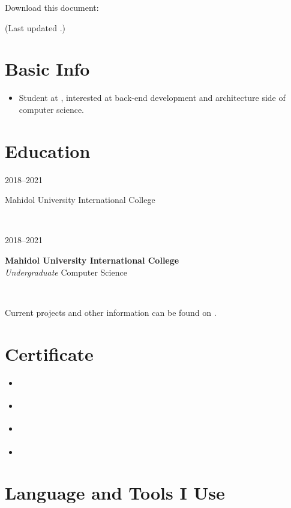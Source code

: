 \documentclass[letterpaper,
		10pt]{article}
\author{Vikrom Narula}
\date{\today}
\let\oldhref\href
\renewcommand{\href}[3][blue]{\oldhref{#2}{\color{#1}{#3}}}
\renewcommand{\maketitle}{
	\hspace{.25\textwidth}
	\begin{minipage}[t]{.5\textwidth}
\par{\centering{\Huge  \bfseries{\theauthor}}\par}
	\end{minipage}
	\begin{minipage}[t]{.25\textwidth}
{\footnotesize\hfill{}\color{gray}
\hfill{}Download this document:

\hfill{}\href[gray]{https://github.com/narula2000/latex-templates/blob/master/cv.pdf}{Here \pdf}

\hfill{}(Last updated \thedate.)
}
	\end{minipage}
}
\newcommand{\entry}[4]{
\ifthenelse{\isempty{#3}}
{\slimentry{#1}{#2}}{

\begin{minipage}[t]{.15\linewidth}
\hfill \textsc{#1}
\end{minipage}
\hfill\vline\hfill
\begin{minipage}[t]{.80\linewidth}
{\bf#2}\\\textit{#3} \footnotesize{#4}
\end{minipage}\\
\vspace{.2cm}
}}
\newcommand{\slimentry}[2]{

\begin{minipage}[t]{.15\linewidth}
\hfill \textsc{#1}
\end{minipage}
\hfill\vline\hfill
\begin{minipage}[t]{.80\linewidth}
#2
\end{minipage}\\
\vspace{.25cm}
}%
\begin{document}
\maketitle

\section{Basic Info}

\begin{itemize}
\item Student at \href{https://muic.mahidol.ac.th/eng/}{Mahidol University International College}, interested at back-end development and architecture side of computer science.
\end{itemize}

\section{Education}

\entry{2018--2021}
	{Mahidol University International College}
	{Undergraduate}
	{Computer Science}


Current projects and other information can be found on \href{https://github.com/narula2000}{Github \www}.

\section{Certificate}
\begin{itemize}
    \item \href{https://courses.cognitiveclass.ai/certificates/2552ddac4a7b442ba08a882913fde68e}{IBM-Blockchain \www}
    \item \href{https://www.coursera.org/account/accomplishments/specialization/certificate/KPATQ89DEUJC}{Coursera-DeepLearning \www}
    \item \href{https://freecodecamp.org/certification/fccfd875aea-9c57-4c5d-a3c3-541bdb54fdb7/javascript-algorithms-and-data-structures}{FreeCodeCamp-Javascript \www }
    \item \href{https://google.dev/badges/playlists/cloud/chatbots-dialogflow?fbclid=IwAR14_zV_bqZt2BOeaxsyfpQGaZTYYakseBRubgepLQ5E3je0KqlEfJWHYR0}{Google-DialogFlow \www}
\end{itemize}

\section{Language  and Tools I Use}
\end{document}
